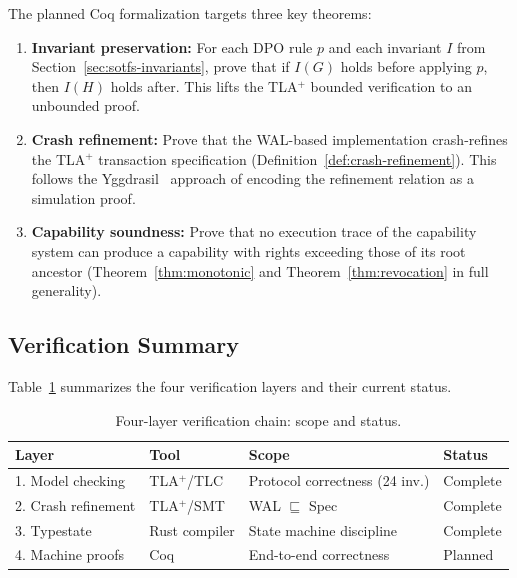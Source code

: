 \documentclass[11pt,a4paper]{article}
\theoremstyle{definition}
\theoremstyle{remark}
\begin{document}
The planned Coq formalization targets three key theorems:

\begin{enumerate}
\item \textbf{Invariant preservation:} For each DPO rule $p$ and
  each invariant $I$ from Section~\ref{sec:sotfs-invariants}, prove
  that if $I(G)$ holds before applying $p$, then $I(H)$ holds after.
  This lifts the TLA$^+$ bounded verification to an unbounded proof.

\item \textbf{Crash refinement:} Prove that the WAL-based
  implementation crash-refines the TLA$^+$ transaction specification
  (Definition~\ref{def:crash-refinement}). This follows the
  Yggdrasil~\cite{sigurbjarnarson2016} approach of encoding the
  refinement relation as a simulation proof.

\item \textbf{Capability soundness:} Prove that no execution trace
  of the capability system can produce a capability with rights
  exceeding those of its root ancestor (Theorem~\ref{thm:monotonic}
  and Theorem~\ref{thm:revocation} in full generality).
\end{enumerate}

\subsection{Verification Summary}
\label{sec:verif-summary}

Table~\ref{tab:verif-layers} summarizes the four verification layers
and their current status.

\begin{table}[H]
\centering
\caption{Four-layer verification chain: scope and status.}
\label{tab:verif-layers}
\small
\begin{tabular}{@{}llll@{}}
\toprule
\textbf{Layer} & \textbf{Tool} & \textbf{Scope} & \textbf{Status} \\
\midrule
1. Model checking & TLA$^+$/TLC & Protocol correctness (24 inv.) & Complete \\
2. Crash refinement & TLA$^+$/SMT & WAL $\sqsubseteq$ Spec & Complete \\
3. Typestate & Rust compiler & State machine discipline & Complete \\
4. Machine proofs & Coq & End-to-end correctness & Planned \\
\bottomrule
\end{tabular}
\end{table}
\end{document}

